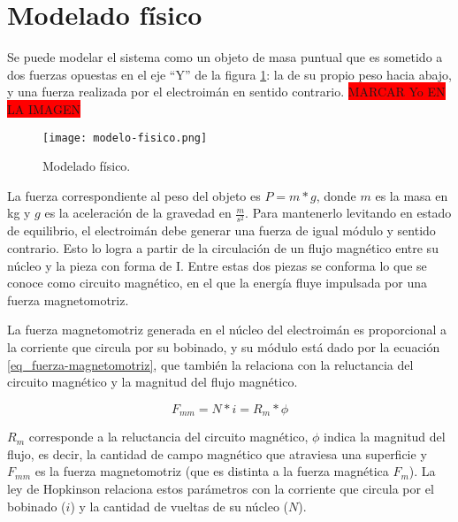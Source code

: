 
\section{Modelado físico}


\noindent Se puede modelar el sistema como un objeto de masa puntual que es sometido a dos fuerzas opuestas en el eje “Y” de la figura \ref{fig:img_modelado-fisico}: la de su propio peso hacia abajo, y una fuerza realizada por el electroimán en sentido contrario. \colorbox{red}{MARCAR Yo EN LA IMAGEN}

\begin{figure}[H]
	\centering
	\texttt{[image: modelo-fisico.png]}
	\caption{Modelado físico.}
	\label{fig:img_modelado-fisico}
\end{figure}

\noindent La fuerza correspondiente al peso del objeto es $P=m*g$, donde $m$ es la masa en kg y $g$ es la aceleración de la gravedad en $\frac{m}{s^{2}}$. Para mantenerlo levitando en estado de equilibrio, el electroimán debe generar una fuerza de igual módulo y sentido contrario. Esto lo logra a partir de la circulación de un flujo magnético entre su núcleo y la pieza con forma de I. Entre estas dos piezas se conforma lo que se conoce como circuito magnético, en el que la energía fluye impulsada por una fuerza magnetomotriz.

\noindent La fuerza magnetomotriz generada en el núcleo del electroimán es proporcional a la corriente que circula por su bobinado, y su módulo está dado por la ecuación \ref{eq_fuerza-magnetomotriz}, que también la relaciona con la reluctancia del circuito magnético y la magnitud del flujo magnético.

\begin{equation} \label{eq_fuerza-magnetomotriz}
	F_{mm}=N*i=R_{m}*\phi	
\end{equation}

\noindent $R_{m}$ corresponde a la reluctancia del circuito magnético, $\phi$ indica la magnitud del flujo, es decir, la cantidad de campo magnético que atraviesa una superficie y $F_{mm}$ es la fuerza magnetomotriz (que es distinta a la fuerza magnética $F_{m}$). La ley de Hopkinson relaciona estos parámetros con la corriente que circula por el bobinado ($i$) y la cantidad de vueltas de su núcleo ($N$).


